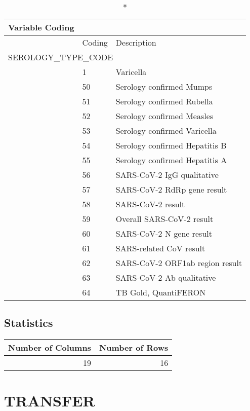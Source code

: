 \documentclass[
  letterpaper,
  DIV=11,
  numbers=noendperiod]{scrreprt}
\begin{document}
\begin{longtable}{l|ll}
\caption*{
{\large Variable Coding}
} \\ 
\toprule
\multicolumn{1}{l}{} & Coding & Description \\ 
\midrule
\multicolumn{3}{l}{SEROLOGY\_TYPE\_CODE} \\ 
\midrule
  & 1 & Varicella \\ 
  & 50 & Serology confirmed Mumps \\ 
  & 51 & Serology confirmed Rubella \\ 
  & 52 & Serology confirmed Measles \\ 
  & 53 & Serology confirmed Varicella \\ 
  & 54 & Serology confirmed Hepatitis B \\ 
  & 55 & Serology confirmed Hepatitis A \\ 
  & 56 & SARS-CoV-2 IgG qualitative \\ 
  & 57 & SARS-CoV-2 RdRp gene result \\ 
  & 58 & SARS-CoV-2 result \\ 
  & 59 & Overall SARS-CoV-2 result \\ 
  & 60 & SARS-CoV-2 N gene result \\ 
  & 61 & SARS-related CoV result \\ 
  & 62 & SARS-CoV-2 ORF1ab region result \\ 
  & 63 & SARS-CoV-2 Ab qualitative \\ 
  & 64 & TB Gold, QuantiFERON \\ 
\bottomrule
\end{longtable}

\hypertarget{statistics-39}{%
\section*{Statistics}\label{statistics-39}}

\begin{longtable}{rr}
\toprule
Number of Columns & Number of Rows \\ 
\midrule
19 & 16 \\ 
\bottomrule
\end{longtable}

\hypertarget{transfer}{%
\chapter*{TRANSFER}\label{transfer}}
\end{document}

